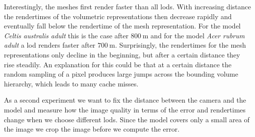 Interestingly, the meshes first render faster than all \acsp{lod}.
With increasing distance the rendertimes of the volumetric representations then decrease rapidly and eventually fall below the rendertime of the mesh representation.
For the model \textit{Celtis australis adult} this is the case after $\SI{800}{\m}$ and for the model \textit{Acer rubrum adult} a \ac{lod} renders faster after $\SI{700}{\m}$.
Surprisingly, the rendertimes for the mesh representations only decline in the beginning, but after a certain distance they rise steadily.
An explanation for this could be that at a certain distance the random sampling of a pixel produces large jumps across the bounding volume hierarchy, which leads to many cache misses.


As a second experiment we want to fix the distance between the camera and the model and measure how the image quality in terms of the \FLIP error and rendertimes change when we choose different \acsp{lod}.
Since the model covers only a small area of the image we crop the image before we compute the \FLIP error.
